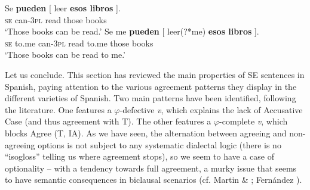 \documentclass[output=paper]{langsci/langscibook}
\begin{document}
\ea%
    \label{ex:key:13}
    \ea
    \gll Se  \textbf{pueden}  [ leer   \textbf{esos    libros} ].\\
         \textsc{se} can\textsc{{}-3pl}   read  those  books\\
    \glt ‘Those books can be read.’
    \ex
    \gll Se   me      \textbf{pueden}  [ leer(?*me)    \textbf{esos    libros} ].\\
         \textsc{se} to.me  can\textsc{{}-3pl}    read   to.me  those  books\\
    \glt ‘Those books can be read to me.’
    \z
\z

Let us conclude. This section has reviewed the main properties of SE sentences in Spanish, paying attention to the various agreement patterns they display in the different varieties of Spanish. Two main patterns have been identified, following the literature. One features a $\varphi $-defective \textit{v}, which explains the lack of Accusative Case (and thus agreement with T). The other features a $\varphi $-complete \textit{v}, which blocks Agree (T, IA). As we have seen, the alternation between agreeing and non-agreeing options is not subject to any systematic dialectal logic (there is no “isogloss” telling us where agreement stops), so we seem to have a case of optionality – with a tendency towards full agreement, a murky issue that seems to have semantic consequences in biclausal scenarios (cf. Martin \& \citealt{Uriagereka1998}; Fernández \citealt{Serrano2016}). 
\end{document}
